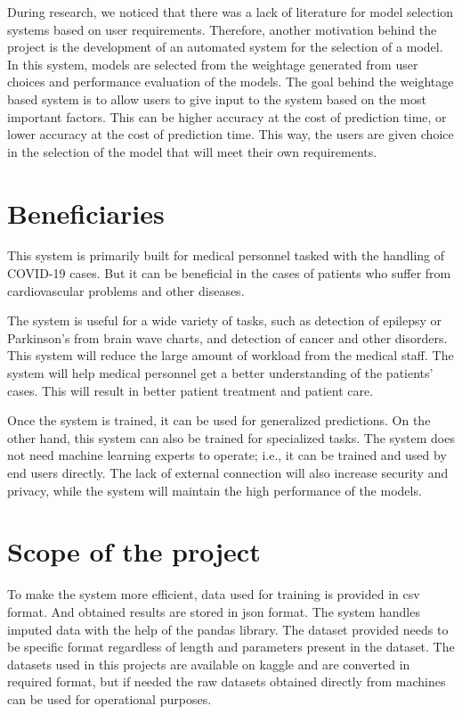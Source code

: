 During research, we noticed that there was a lack of literature for model selection systems based on user requirements. Therefore, another motivation behind the project is the development of an automated system for the selection of a model. In this system, models are selected from the weightage generated from user choices and performance evaluation of the models. The goal behind the weightage based system is to allow users to give input to the system based on the most important factors. This can be higher accuracy at the cost of prediction time, or lower accuracy at the cost of prediction time. This way, the users are given choice in the selection of the model that will meet their own requirements.

\section{Beneficiaries} \label{sec:beneficiaries}

This system is primarily built for medical personnel tasked with the handling of COVID-19 cases. But it can be beneficial in the cases of patients who suffer from cardiovascular problems and other diseases.

The system is useful for a wide variety of tasks, such as detection of epilepsy or Parkinson's from brain wave charts, and detection of cancer and other disorders. This system will reduce the large amount of workload from the medical staff. The system will help medical personnel get a better understanding of the patients' cases. This will result in better patient treatment and patient care.

Once the system is trained, it can be used for generalized predictions. On the other hand, this system can also be trained for specialized tasks. The system does not need machine learning experts to operate; i.e., it can be trained and used by end users directly. The lack of external connection will also increase security and privacy, while the system will maintain the high performance of the models.

\section{Scope of the project} \label{sec:scope_of_the_project}

To make the system more efficient, data used for training is provided in csv format. And obtained results are stored in json format. The system handles imputed data with the help of the pandas library. The dataset provided needs to be specific format regardless of length and parameters present in the dataset. The datasets used in this projects are available on kaggle and are converted in required format, but if needed the raw datasets obtained directly from machines can be used for operational purposes.

